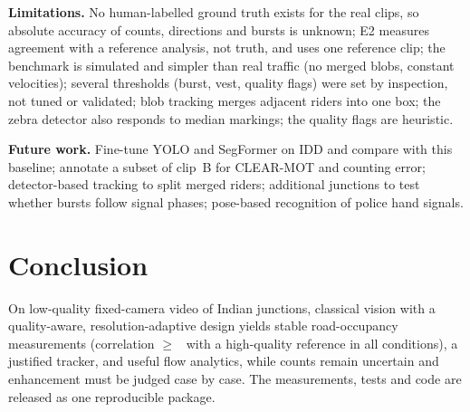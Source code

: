 \documentclass[10pt,twocolumn,a4paper]{article}
\begin{document}
\textbf{Limitations.} No human-labelled ground truth exists for the real clips, so absolute accuracy of counts, directions and bursts is unknown; E2 measures agreement with a reference analysis, not truth, and uses one reference clip; the benchmark is simulated and simpler than real traffic (no merged blobs, constant velocities); several thresholds (burst, vest, quality flags) were set by inspection, not tuned or validated; blob tracking merges adjacent riders into one box; the zebra detector also responds to median markings; the quality flags are heuristic.

\textbf{Future work.} Fine-tune YOLO and SegFormer on IDD and compare with this baseline; annotate a subset of clip~B for CLEAR-MOT and counting error; detector-based tracking to split merged riders; additional junctions to test whether bursts follow signal phases; pose-based recognition of police hand signals.

\section{Conclusion}
On low-quality fixed-camera video of Indian junctions, classical vision with a quality-aware, resolution-adaptive design yields stable road-occupancy measurements (correlation $\ge$ \mRobMinR\ with a high-quality reference in all conditions), a justified tracker, and useful flow analytics, while counts remain uncertain and enhancement must be judged case by case.
The measurements, tests and code are released as one reproducible package.
\end{document}
